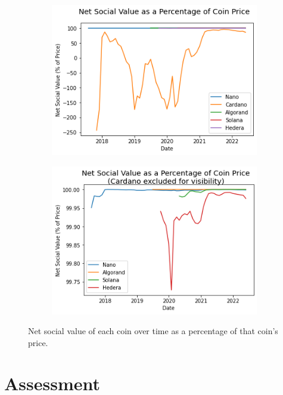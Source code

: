 \documentclass{article}
\begin{document}
\begin{figure}[h!]
  \centering
  \begin{subfigure}[b]{0.45\linewidth}
    \includegraphics[width=\linewidth]{images/net_social_value_percent.png}
  \end{subfigure}
  \begin{subfigure}[b]{0.45\linewidth}
    \includegraphics[width=\linewidth]{images/net_social_value_percent_no_cardano.png}
  \end{subfigure}
  \caption{Net social value of each coin over time as a percentage of that coin's price.}
  \label{fig:net_social_value_percents}
\end{figure}

\section{Assessment}
\end{document}
